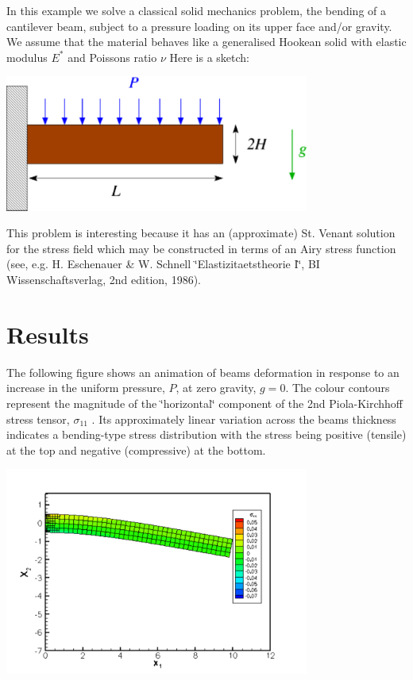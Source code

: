 In this example we solve a classical solid mechanics problem, the bending of a cantilever beam, subject to a pressure loading on its upper face and/or gravity. We assume that the material behaves like a generalised Hookean solid with elastic modulus $ E^* $ and Poisson\textquotesingle{}s ratio $ \nu $ Here is a sketch\+:

 
\begin{DoxyImage}
\includegraphics[width=0.75\textwidth]{airy_cantilever_sketch}
\end{DoxyImage}


This problem is interesting because it has an (approximate) St. Venant solution for the stress field which may be constructed in terms of an Airy stress function (see, e.\+g. H. Eschenauer \& W. Schnell \char`\"{}\+Elastizitaetstheorie I\char`\"{}, BI Wissenschaftsverlag, 2nd edition, 1986).



 

\hypertarget{index_results}{}\section{Results}\label{index_results}
The following figure shows an animation of beam\textquotesingle{}s deformation in response to an increase in the uniform pressure, $ P $, at zero gravity, $ g=0 $. The colour contours represent the magnitude of the \char`\"{}horizontal\char`\"{} component of the 2nd Piola-\/\+Kirchhoff stress tensor, $ \sigma_{11} $ . Its approximately linear variation across the beam\textquotesingle{}s thickness indicates a bending-\/type stress distribution with the stress being positive (tensile) at the top and negative (compressive) at the bottom.

 
\begin{DoxyImage}
\includegraphics[width=0.75\textwidth]{beam_animation}
\end{DoxyImage}


